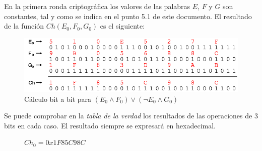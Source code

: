 \documentclass{article}
\begin{document}
        \vspace{3mm}
        En la primera ronda criptográfica los valores de las palabras $E$, $F$ y $G$ son constantes, tal y como se indica en el punto 5.1 de este documento. El resultado de la función $Ch(E_{0}, F_{0}, G_{0})$ es el siguiente:
            \begin{figure}[H]
            \centering
                \includegraphics[scale=0.41]{img/SHA-256-function_Ch.png}
                \caption{Cálculo bit a bit para $(E_{0} \land F_{0}) \lor (\lnot E_{0} \land G_{0})$}
            \end{figure}
        Se puede comprobar en la \textit{tabla de la verdad} los resultados de las operaciones de 3 bits en cada caso. El resultado siempre se expresará en hexadecimal.
            \begin{figure}[H]
            \centering
                $Ch_{0} = 0x1F85C98C$
            \end{figure}
        
\end{document}
